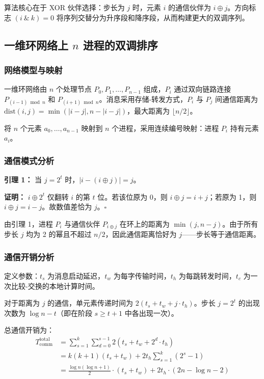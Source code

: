 \documentclass[UTF8,a4paper,10pt]{ctexart}
\begin{document}
算法核心在于 XOR 伙伴选择：步长为 $j$ 时，元素 $i$ 的通信伙伴为 $i \oplus j$。方向标志 $(i\ \&\ k) = 0$ 将序列交替分为升序段和降序段，从而构建更大的双调序列。

\subsection{一维环网络上 $n$ 进程的双调排序}

\subsubsection{网络模型与映射}

一维环网络由 $n$ 个处理节点 $P_0, P_1, \ldots, P_{n-1}$ 组成，$P_i$ 通过双向链路连接 $P_{(i-1) \bmod n}$ 和 $P_{(i+1) \bmod n}$。消息采用存储-转发方式，$P_i$ 与 $P_j$ 间通信距离为 $\text{dist}(i, j) = \min(|i - j|, n - |i - j|)$，最大距离为 $\lfloor n/2 \rfloor$。

将 $n$ 个元素 $a_0, \ldots, a_{n-1}$ 映射到 $n$ 个进程，采用连续编号映射：进程 $P_i$ 持有元素 $a_i$。

\subsubsection{通信模式分析}

\textbf{引理 1：} 当 $j = 2^t$ 时，$|i - (i \oplus j)| = j$。

\textbf{证明：} $i \oplus 2^t$ 仅翻转 $i$ 的第 $t$ 位。若该位原为 0，则 $i \oplus j = i + j$；若原为 1，则 $i \oplus j = i - j$。故数值差恰为 $j$。\hfill $\square$

由引理 1，进程 $P_i$ 与通信伙伴 $P_{i \oplus j}$ 在环上的距离为 $\min(j, n-j)$。由于所有步长 $j$ 均为 2 的幂且不超过 $n/2$，因此通信距离恰好为 $j$——步长等于通信距离。

\subsubsection{通信开销分析}

定义参数：$t_s$ 为消息启动延迟，$t_w$ 为每字传输时间，$t_h$ 为每跳转发时间，$t_c$ 为一次比较-交换的本地计算时间。

对于距离为 $j$ 的通信，单元素传递时间为 $2(t_s + t_w + j \cdot t_h)$。步长 $j = 2^t$ 的出现次数为 $\log n - t$（即在阶段 $s \geq t+1$ 中各出现一次）。

总通信开销为：
\begin{equation}
\begin{aligned}
T_{\text{comm}}^{\text{total}} &= \sum_{s=1}^{k} \sum_{d=0}^{s-1} 2(t_s + t_w + 2^d \cdot t_h) \\
&= k(k+1)(t_s + t_w) + 2t_h \sum_{s=1}^{k} (2^s - 1) \\
&= \frac{\log n(\log n + 1)}{2} \cdot (t_s + t_w) + 2t_h \cdot (2n - \log n - 2)
\end{aligned}
\end{equation}
\end{document}
